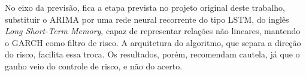 No eixo da previsão, fica a etapa prevista no projeto original deste trabalho,
substituir o ARIMA por uma rede neural recorrente do
tipo LSTM, do inglês \textit{Long Short-Term Memory}, capaz de representar relações
não lineares, mantendo o GARCH como filtro de risco. A arquitetura do algoritmo,
que separa a direção do risco, facilita essa troca. Os
resultados, porém, recomendam cautela, já que o ganho veio do controle de risco,
e não do acerto.
